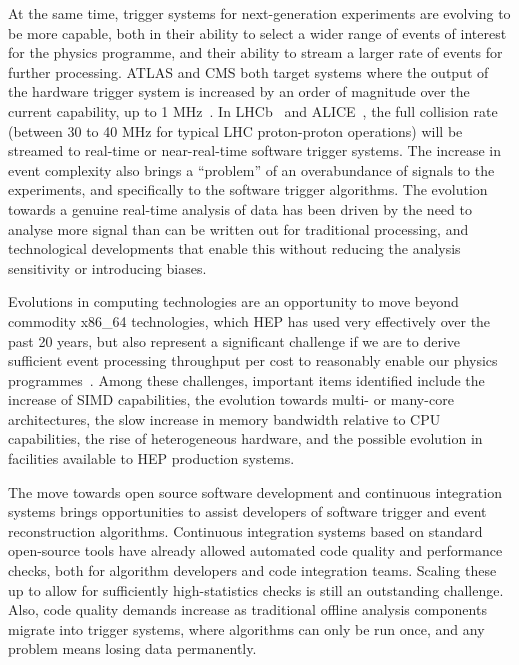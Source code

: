 At the same time, trigger systems for next-generation experiments are
evolving to be more capable, both in their ability to select a wider
range of events of interest for the physics programme, and their ability
to stream a larger rate of events for further processing. ATLAS and CMS
both target systems where the output of the hardware trigger system is
increased by an order of magnitude over the current capability, up to 1
MHz~\cite{CERN-LHCC-2015-020,CMSCollaboration:2015zni}. In LHCb~\cite{CERN-LHCC-2014-016}
and ALICE~\cite{Buncic:2011297}, the full collision
rate (between 30 to 40 MHz for typical LHC proton-proton operations)
will be streamed to real-time or near-real-time software trigger
systems. The increase in event complexity also brings a ``problem'' of
an overabundance of signals to the experiments, and specifically to the
software trigger algorithms. The evolution towards a genuine real-time
analysis of data has been driven by the need to analyse more signal than
can be written out for traditional processing, and technological
developments that enable this without reducing the analysis sensitivity
or introducing biases.

Evolutions in computing technologies are an opportunity to move
beyond commodity x86\_64 technologies, which HEP has used very
effectively over the past 20 years, but also represent a significant challenge
if we are to
derive sufficient event processing throughput per cost to reasonably
enable our physics programmes~\cite{Bird:1695401}.
Among these challenges, important items identified include the increase
of SIMD capabilities, the evolution towards multi- or many-core
architectures, the slow increase in memory bandwidth relative to CPU
capabilities, the rise of heterogeneous hardware, and the possible
evolution in facilities available to HEP production systems.

The move towards open source software development and continuous
integration systems brings opportunities to assist developers of
software trigger and event reconstruction algorithms. Continuous
integration systems based on standard open-source tools have already
allowed automated code quality and performance checks, both for
algorithm developers and code integration teams. Scaling these up to
allow for sufficiently high-statistics checks is still an
outstanding challenge. Also, code quality demands increase as
traditional offline analysis components migrate into trigger systems,
where algorithms can only be run once, and any problem means losing data
permanently.

